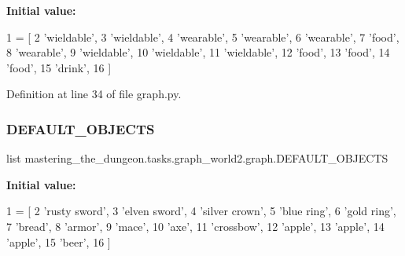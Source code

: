 {\bfseries Initial value\+:}
\begin{DoxyCode}
1 =  [
2     \textcolor{stringliteral}{'wieldable'},
3     \textcolor{stringliteral}{'wieldable'},
4     \textcolor{stringliteral}{'wearable'},
5     \textcolor{stringliteral}{'wearable'},
6     \textcolor{stringliteral}{'wearable'},
7     \textcolor{stringliteral}{'food'},
8     \textcolor{stringliteral}{'wearable'},
9     \textcolor{stringliteral}{'wieldable'},
10     \textcolor{stringliteral}{'wieldable'},
11     \textcolor{stringliteral}{'wieldable'},
12     \textcolor{stringliteral}{'food'},
13     \textcolor{stringliteral}{'food'},
14     \textcolor{stringliteral}{'food'},
15     \textcolor{stringliteral}{'drink'},
16 ]
\end{DoxyCode}


Definition at line 34 of file graph.\+py.

\mbox{\label{namespacemastering__the__dungeon_1_1tasks_1_1graph__world2_1_1graph_a454b9acae4b1cf5b4b92287fbcba46ec}} 
\subsubsection{\texorpdfstring{D\+E\+F\+A\+U\+L\+T\+\_\+\+O\+B\+J\+E\+C\+TS}{DEFAULT\_OBJECTS}}
{\footnotesize\ttfamily list mastering\+\_\+the\+\_\+dungeon.\+tasks.\+graph\+\_\+world2.\+graph.\+D\+E\+F\+A\+U\+L\+T\+\_\+\+O\+B\+J\+E\+C\+TS}

{\bfseries Initial value\+:}
\begin{DoxyCode}
1 =  [
2     \textcolor{stringliteral}{'rusty sword'},
3     \textcolor{stringliteral}{'elven sword'},
4     \textcolor{stringliteral}{'silver crown'},
5     \textcolor{stringliteral}{'blue ring'},
6     \textcolor{stringliteral}{'gold ring'},
7     \textcolor{stringliteral}{'bread'},
8     \textcolor{stringliteral}{'armor'},
9     \textcolor{stringliteral}{'mace'},
10     \textcolor{stringliteral}{'axe'},
11     \textcolor{stringliteral}{'crossbow'},
12     \textcolor{stringliteral}{'apple'},
13     \textcolor{stringliteral}{'apple'},
14     \textcolor{stringliteral}{'apple'},
15     \textcolor{stringliteral}{'beer'},
16 ]
\end{DoxyCode}



